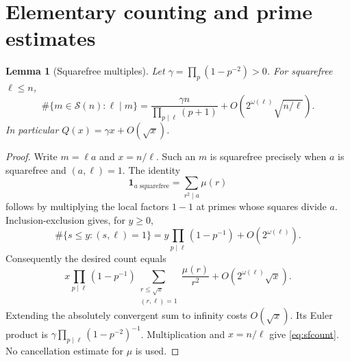 \documentclass[11pt]{article}
\newtheorem{lemma}[theorem]{Lemma}
\theoremstyle{remark}\newtheorem{remark}[theorem]{Remark}
\newcommand{\sfset}{\mathcal S}
\newcommand{\ind}{\mathbf 1}
\begin{document}
\section{Elementary counting and prime estimates}

\begin{lemma}[Squarefree multiples]\label{lem:squarefree}
Let $\gamma=\prod_p(1-p^{-2})>0$. For squarefree $\ell\le n$,
\begin{equation}\label{eq:sfcount}
 \#\{m\in\sfset(n):\ell\mid m\}
 =\frac{\gamma n}{\prod_{p\mid\ell}(p+1)}
 +O\left(2^{\omega(\ell)}\sqrt{n/\ell}\right).
\end{equation}
In particular $Q(x)=\gamma x+O(\sqrt x)$.
\end{lemma}
\begin{proof}
Write $m=\ell a$ and $x=n/\ell$. Such an $m$ is squarefree precisely when $a$ is squarefree and $(a,\ell)=1$. The identity
\[
 \ind_{a\text{ squarefree}}=\sum_{r^2\mid a}\mu(r)
\]
follows by multiplying the local factors $1-1$ at primes whose squares divide $a$. Inclusion-exclusion gives, for $y\ge0$,
\[
 \#\{s\le y:(s,\ell)=1\}
 =y\prod_{p\mid\ell}(1-p^{-1})+O(2^{\omega(\ell)}).
\]
Consequently the desired count equals
\[
 x\prod_{p\mid\ell}(1-p^{-1})
 \sum_{\substack{r\le\sqrt x\\(r,\ell)=1}}\frac{\mu(r)}{r^2}
 +O(2^{\omega(\ell)}\sqrt x).
\]
Extending the absolutely convergent sum to infinity costs $O(\sqrt x)$. Its Euler product is $\gamma\prod_{p\mid\ell}(1-p^{-2})^{-1}$. Multiplication and $x=n/\ell$ give \eqref{eq:sfcount}. No cancellation estimate for $\mu$ is used.
\end{proof}
\end{document}
